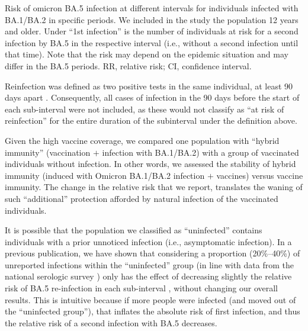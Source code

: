 \begin{table}
    \centering
    \caption[Risk of omicron BA.5 infection at different intervals for individuals infected with BA.1/BA.2 in specific periods]{Risk of omicron BA.5 infection at different intervals for individuals infected with BA.1/BA.2 in specific periods. We included in the study the population 12 years and older. Under ``1st infection'' is the number of individuals at risk for a second infection by BA.5 in the respective interval (i.e., without a second infection until that time). Note that the risk may depend on the epidemic situation and may differ in the BA.5 periods. RR, relative risk; CI, confidence interval.}
    \resizebox*{0.9\textwidth}{\dimexpr\textheight-2\baselineskip\relax}{}
    \label{tab:tabs2-omicron-infection-risk}
\end{table}

Reinfection was defined as two positive tests in the same individual, at least 90 days apart \citep{worldhealthorganizaton2022PublicHealth}. Consequently, all cases of infection in the 90 days before the start of each sub-interval were not included, as these would not classify as ``at risk of reinfection'' for the entire duration of the subinterval under the definition above.

Given the high vaccine coverage, we compared one population with ``hybrid immunity'' (vaccination $+$ infection with BA.1/BA.2) with a group of vaccinated individuals without infection. In other words, we assessed the stability of hybrid immunity (induced with Omicron BA.1/BA.2 infection $+$ vaccines) versus vaccine immunity. The change in the relative risk that we report, translates the waning of such ``additional'' protection afforded by natural infection of the vaccinated individuals.

It is possible that the population we classified as ``uninfected'' contains individuals with a prior unnoticed infection (i.e., asymptomatic infection). In a previous publication, we have shown that considering a proportion (20\%--40\%) of unreported infections within the ``uninfected'' group (in line with data from the national serologic survey \citep{institutonacionaldesaudedoutorricardojorge2021NationalCOVID19}) only has the effect of decreasing slightly the relative risk of BA.5 re-infection in each sub-interval \citep{malatoRiskBAInfection2022}, without changing our overall results. This is intuitive because if more people were infected (and moved out of the ``uninfected group''), that inflates the absolute risk of first infection, and thus the relative risk of a second infection with BA.5 decreases. 

